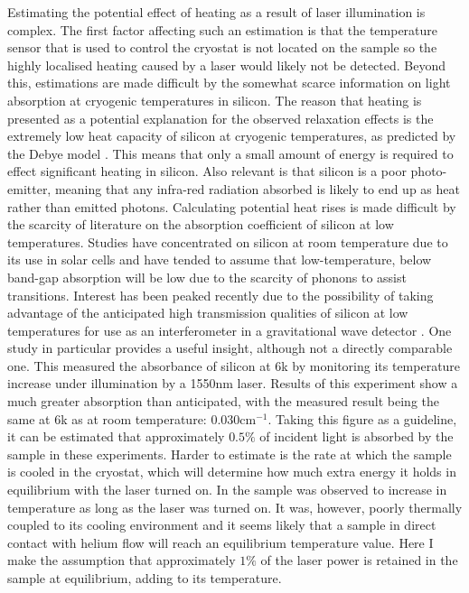 Estimating the potential effect of heating as a result of laser illumination is complex.
The first factor affecting such an estimation is that the temperature sensor that is used to control the cryostat is not located on the sample so the highly localised heating caused by a laser would likely not be detected.
Beyond this, estimations are made difficult by the somewhat scarce information on light absorption at cryogenic temperatures in silicon.
The reason that heating is presented as a potential explanation for the observed relaxation effects is the extremely low heat capacity of silicon at cryogenic temperatures, as predicted by the Debye model \cite{ANDP:ANDP19123441404}.
This means that only a small amount of energy is required to effect significant heating in silicon.
Also relevant is that silicon is a poor photo-emitter, meaning that any infra-red radiation absorbed is likely to end up as heat rather than emitted photons. 
Calculating potential heat rises is made difficult by the scarcity of literature on the absorption coefficient of silicon at low temperatures.
Studies have concentrated on silicon at room temperature due to its use in solar cells and have tended to assume that low-temperature, below band-gap absorption will be low due to the scarcity of phonons to assist transitions.
Interest has been peaked recently due to the possibility of taking advantage of the anticipated high transmission qualities of silicon at low temperatures for use as an interferometer in a gravitational wave detector \cite{Degallaix2014}.
One study in particular provides a useful insight, although not a directly comparable one.
This measured the absorbance of silicon at 6k by monitoring its temperature increase under illumination by a 1550nm laser.
Results of this experiment show a much greater absorption than anticipated, with the measured result being the same at 6k as at room temperature: 0.030cm$^{-1}$.
Taking this figure as a guideline, it can be estimated that approximately $0.5\%$ of incident light is absorbed by the sample in these experiments.
Harder to estimate is the rate at which the sample is cooled in the cryostat, which will determine how much extra energy it holds in equilibrium with the laser turned on.
In \cite{Degallaix2014} the sample was observed to increase in temperature as long as the laser was turned on.
It was, however, poorly thermally coupled to its cooling environment and it seems likely that a sample in direct contact with helium flow will reach an equilibrium temperature value.
Here I make the assumption that approximately $1\%$ of the laser power is retained in the sample at equilibrium, adding to its temperature.
